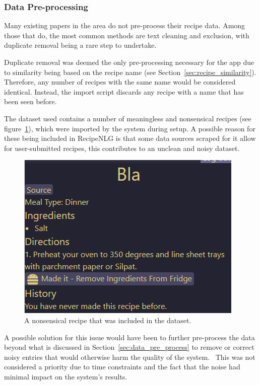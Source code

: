 \subsubsection{Data Pre-processing}
Many existing papers in the area do not pre-process their recipe data. Among those that do, the most
common methods are text cleaning and exclusion, with duplicate removal being a rare step to undertake.~\cite{bondevik_systematic_2024}

Duplicate removal was deemed the only pre-processing necessary for the \chef{} app due to similarity being
based on the recipe name (see Section~\ref{sec:recipe_similarity}). Therefore, any number of recipes with the same
name would be considered identical. Instead, the import script discards any recipe with a name that has been seen before.

The dataset used contains a number of meaningless and nonsensical recipes (see
figure~\ref{fig:bad_recipe_entry}), which were imported by the \chef{} system during setup.
A possible reason for these being included in RecipeNLG is that some
data sources scraped for it allow for user-submitted recipes, this contributes to
an unclean and noisy dataset.~\cite{kicherer_what_2018}

\begin{figure}[h]
    \centering
    \caption{\label{fig:bad_recipe_entry}A nonsensical recipe that was included in the dataset.}
    \includegraphics[scale=0.75]{figures/bad_recipe_entry.png}
\end{figure}

A possible solution for this issue would have been to further pre-process the data beyond what is
discussed in Section~\ref{sec:data_pre_process} to remove or correct noisy entries that would otherwise
harm the quality of the system.~\cite{garcia_big_2016} This was not considered a priority due to time
constraints and the fact that the noise had minimal impact on the system's results.

